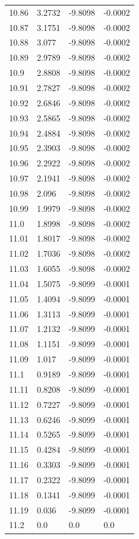 \begin{tabular}{llll}
10.86 & 3.2732 & -9.8098 & -0.0002 \\
10.87 & 3.1751 & -9.8098 & -0.0002 \\
10.88 & 3.077 & -9.8098 & -0.0002 \\
10.89 & 2.9789 & -9.8098 & -0.0002 \\
10.9 & 2.8808 & -9.8098 & -0.0002 \\
10.91 & 2.7827 & -9.8098 & -0.0002 \\
10.92 & 2.6846 & -9.8098 & -0.0002 \\
10.93 & 2.5865 & -9.8098 & -0.0002 \\
10.94 & 2.4884 & -9.8098 & -0.0002 \\
10.95 & 2.3903 & -9.8098 & -0.0002 \\
10.96 & 2.2922 & -9.8098 & -0.0002 \\
10.97 & 2.1941 & -9.8098 & -0.0002 \\
10.98 & 2.096 & -9.8098 & -0.0002 \\
10.99 & 1.9979 & -9.8098 & -0.0002 \\
11.0 & 1.8998 & -9.8098 & -0.0002 \\
11.01 & 1.8017 & -9.8098 & -0.0002 \\
11.02 & 1.7036 & -9.8098 & -0.0002 \\
11.03 & 1.6055 & -9.8098 & -0.0002 \\
11.04 & 1.5075 & -9.8099 & -0.0001 \\
11.05 & 1.4094 & -9.8099 & -0.0001 \\
11.06 & 1.3113 & -9.8099 & -0.0001 \\
11.07 & 1.2132 & -9.8099 & -0.0001 \\
11.08 & 1.1151 & -9.8099 & -0.0001 \\
11.09 & 1.017 & -9.8099 & -0.0001 \\
11.1 & 0.9189 & -9.8099 & -0.0001 \\
11.11 & 0.8208 & -9.8099 & -0.0001 \\
11.12 & 0.7227 & -9.8099 & -0.0001 \\
11.13 & 0.6246 & -9.8099 & -0.0001 \\
11.14 & 0.5265 & -9.8099 & -0.0001 \\
11.15 & 0.4284 & -9.8099 & -0.0001 \\
11.16 & 0.3303 & -9.8099 & -0.0001 \\
11.17 & 0.2322 & -9.8099 & -0.0001 \\
11.18 & 0.1341 & -9.8099 & -0.0001 \\
11.19 & 0.036 & -9.8099 & -0.0001 \\
11.2 & 0.0 & 0.0 & 0.0 \\
\bottomrule
\end{tabular}
